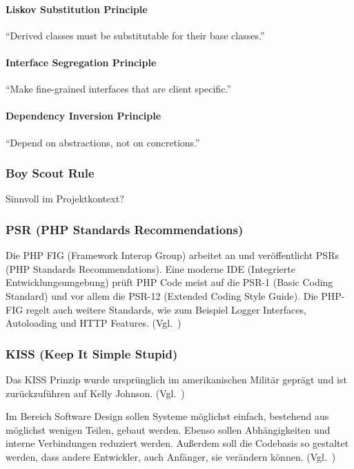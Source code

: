 \paragraph{Liskov Substitution Principle}
\enquote{Derived classes must be substitutable for their base classes.}\cite{solid}

\paragraph{Interface Segregation Principle}
\enquote{Make fine-grained interfaces that are client specific.}\cite{solid}

\paragraph{Dependency Inversion Principle}
\enquote{Depend on abstractions, not on concretions.}\cite{solid}

\subsubsection{Boy Scout Rule}
Sinnvoll im Projektkontext?

\subsubsection{PSR (PHP Standards Recommendations)}
Die PHP FIG (Framework Interop Group) arbeitet an und veröffentlicht PSRs (PHP Standards Recommendations).
Eine moderne IDE (Integrierte Entwicklungsumgebung) prüft PHP Code meist auf die PSR-1 (Basic Coding Standard) und vor allem die PSR-12 (Extended Coding Style Guide).
Die PHP-FIG regelt auch weitere Standards, wie zum Beispiel Logger Interfaces, Autoloading und HTTP Features.
(Vgl.~\cite{psr})

\subsubsection{KISS (Keep It Simple Stupid)}
Das KISS Prinzip wurde ursprünglich im amerikanischen Militär geprägt und ist zurückzuführen auf Kelly Johnson.
(Vgl.~\cite{kelly-johnson-memoir})

Im Bereich Software Design sollen Systeme möglichst einfach, bestehend aus möglichst wenigen Teilen, gebaut werden.
Ebenso sollen Abhängigkeiten und interne Verbindungen reduziert werden.
Außerdem soll die Codebasis so gestaltet werden, dass andere Entwickler, auch Anfänger, sie verändern können.
(Vgl.~\cite{kiss-principle-explained})

